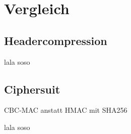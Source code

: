 \chapter{Vergleich}

\section{Headercompression}

lala  soso

\section{Ciphersuit}

CBC-MAC anstatt HMAC mit SHA256

lala  soso